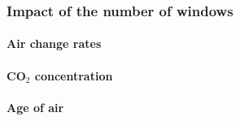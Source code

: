 
\blindtext[1]

\blindtext[1]


\cleartoleftpage

\subsubsection{Impact of the number of windows}
\enlargethispage*{4cm}

\blindtext[1]


\paragraph{Air change rates}

\blindtext[1]


\paragraph{CO$_2$ concentration}

\blindtext[1]


\paragraph{Age of air}

\blindtext[1]




